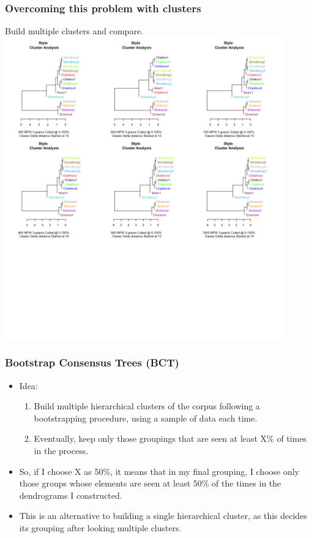 \documentclass{beamer}
\begin{document}
\begin{frame}
\frametitle{Overcoming this problem with clusters}
Build multiple clusters and compare. 
\\ \includegraphics[width=0.9\textwidth]{ChangingMFW.png}
\end{frame}

\begin{frame}
\frametitle{Bootstrap Consensus Trees (BCT)}
\begin{itemize}
\item Idea: 
\begin{enumerate}
\item Build multiple hierarchical clusters of the corpus following a bootstrapping procedure, using a sample of data each time. 
\item Eventually, keep only those groupings that are seen at least X\% of times in the process. 
\end{enumerate}
\item So, if I choose X as 50\%, it means that in my final grouping, I choose only those groups whose elements are seen at least 50\% of the times in the dendrograms I constructed. 
\item This is an alternative to building a single hierarchical cluster, as this decides its grouping after looking multiple clusters.
\end{itemize}
\end{frame}
\end{document}
